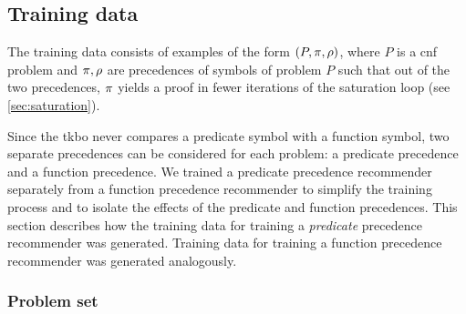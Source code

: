 


\subsection{Training data}

The training data consists of examples of the form $(P, \pi, \rho)$,
where $P$ is a \gls{cnf} problem and $\pi, \rho$ are precedences of symbols of problem $P$
such that out of the two precedences, $\pi$ yields a proof in fewer iterations of the saturation loop (see \cref{sec:saturation}).

Since the \gls{tkbo} never compares a predicate symbol with a function symbol,
two separate precedences can be considered for each problem:
a predicate precedence and a function precedence.
We trained a predicate precedence recommender separately from a function precedence recommender
to simplify the training process and to isolate the effects of the predicate and function precedences.
This section describes how the training data for training a \emph{predicate} precedence recommender was generated.
Training data for training a function precedence recommender was generated analogously.

\subsubsection{Problem set}

